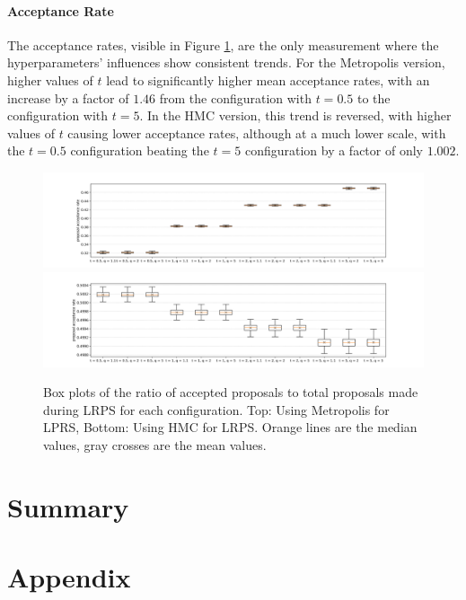 \documentclass[12pt, a4paper]{report}
\begin{document}
\subsubsection{Acceptance Rate}
The acceptance rates, visible in Figure \ref{fig:results_params_acceptance_rates}, are the only measurement where the hyperparameters' influences show consistent trends.
For the Metropolis version, higher values of $t$ lead to significantly higher mean acceptance rates, with an increase by a factor of $1.46$ from the configuration with $t=0.5$ to the configuration with $t=5$.
In the HMC version, this trend is reversed, with higher values of $t$ causing lower acceptance rates, although at a much lower scale, with the $t=0.5$ configuration beating the $t=5$ configuration by a factor of only $1.002$.
\begin{figure}
    \centering
    \includegraphics[trim={3cm 0cm 3cm 0cm}, clip, width=\textwidth]{figs/results/params/acceptance_rates_metropolis.png}
    \includegraphics[trim={3cm 0cm 3cm 0cm}, clip, width=\textwidth]{figs/results/params/acceptance_rates_hmc.png}
    \caption{Box plots of the ratio of accepted proposals to total proposals made during LRPS for each configuration. Top: Using Metropolis for LPRS, Bottom: Using HMC for LRPS. Orange lines are the median values, gray crosses are the mean values.}
    \label{fig:results_params_acceptance_rates}
\end{figure}

\chapter{Summary}

\clearpage
\printbibliography
{}

\clearpage
\chapter*{Appendix}
\end{document}
